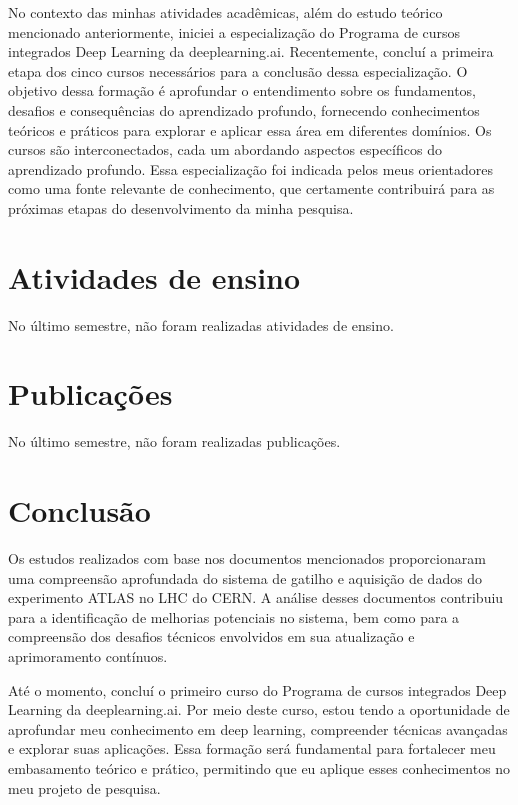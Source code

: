 No contexto das minhas atividades acadêmicas, além do estudo teórico mencionado anteriormente, iniciei a especialização do Programa de cursos integrados Deep Learning da deeplearning.ai. Recentemente, concluí a primeira etapa dos cinco cursos necessários para a conclusão dessa especialização. O objetivo dessa formação é aprofundar o entendimento sobre os fundamentos, desafios e consequências do aprendizado profundo, fornecendo conhecimentos teóricos e práticos para explorar e aplicar essa área em diferentes domínios. Os cursos são interconectados, cada um abordando aspectos específicos do aprendizado profundo. Essa especialização foi indicada pelos meus orientadores como uma fonte relevante de conhecimento, que certamente contribuirá para as próximas etapas do desenvolvimento da minha pesquisa.


\section{Atividades de ensino}\label{cap:ensino}

No último semestre, não foram realizadas atividades de ensino.

\section{Publicações}\label{cap:pub}

No último semestre, não foram realizadas publicações.

\section{Conclusão}\label{cap:conclusao}

Os estudos realizados com base nos documentos mencionados proporcionaram uma compreensão aprofundada do sistema de gatilho e aquisição de dados do experimento ATLAS no LHC do CERN. A análise desses documentos contribuiu para a identificação de melhorias potenciais no sistema, bem como para a compreensão dos desafios técnicos envolvidos em sua atualização e aprimoramento contínuos.

Até o momento, concluí o primeiro curso do Programa de cursos integrados Deep Learning da deeplearning.ai. Por meio deste curso, estou tendo a oportunidade de aprofundar meu conhecimento em deep learning, compreender técnicas avançadas e explorar suas aplicações. Essa formação será fundamental para fortalecer meu embasamento teórico e prático, permitindo que eu aplique esses conhecimentos no meu projeto de pesquisa.


